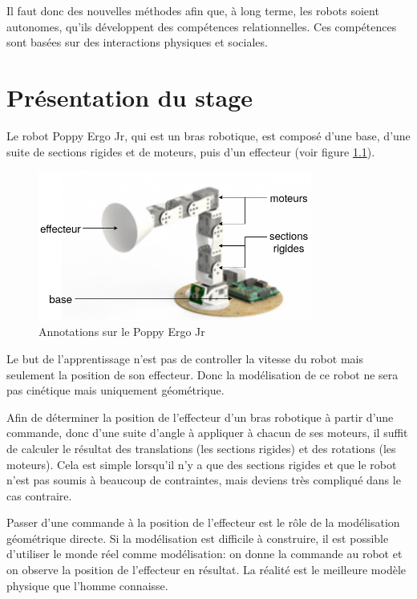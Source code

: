 \documentclass[11pt,french]{report}
\begin{document}
Il faut donc des nouvelles méthodes afin que, à long terme, les robots soient autonomes, qu'ils développent des compétences relationnelles.
Ces compétences sont basées sur des interactions physiques et sociales.

\chapter{Présentation du stage}

Le robot Poppy Ergo Jr, qui est un bras robotique, est composé d'une base, d'une suite de sections rigides et de moteurs, puis d'un effecteur (voir figure \ref{fig:SchemaPoppyErgoJr}).

\phantom{INVISIBLE LINE}

\begin{figure}[H]
    \centering
    \includegraphics[height=140pt]{Poppy_Diagram} 
    \caption{Annotations sur le Poppy Ergo Jr}
    \label{fig:SchemaPoppyErgoJr}
\end{figure}

Le but de l'apprentissage n'est pas de controller la vitesse du robot mais seulement la position de son effecteur.
Donc la modélisation de ce robot ne sera pas cinétique mais uniquement géométrique.

\phantom{INVISIBLE LINE}

Afin de déterminer la position de l'effecteur d'un bras robotique à partir d'une commande, donc d'une suite d'angle à appliquer à chacun de ses moteurs, il suffit de calculer le résultat des translations (les sections rigides) et des rotations (les moteurs).
Cela est simple lorsqu'il n'y a que des sections rigides et que le robot n'est pas soumis à beaucoup de contraintes, mais deviens très compliqué dans le cas contraire.

Passer d'une commande à la position de l'effecteur est le rôle de la modélisation géométrique directe.
Si la modélisation est difficile à construire, il est possible d'utiliser le monde réel comme modélisation: on donne la commande au robot et on observe la position de l'effecteur en résultat.
La réalité est le meilleure modèle physique que l'homme connaisse.
\end{document}
